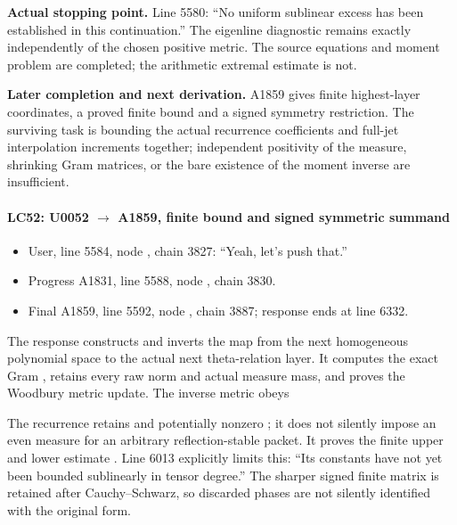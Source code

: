 \textbf{Actual stopping point.} Line 5580: ``No uniform sublinear excess
has been established in this continuation.'' The eigenline diagnostic
remains exactly \protect{} independently of the chosen
positive metric. The source equations and moment problem are completed;
the arithmetic extremal estimate is not.

\textbf{Later completion and next derivation.} A1859 gives finite
highest-layer coordinates, a proved finite bound and a signed symmetry
restriction. The surviving task is bounding the actual recurrence
coefficients and full-jet interpolation increments together; independent
positivity of the measure, shrinking Gram matrices, or the bare
existence of the moment inverse are insufficient.

\paragraph{\texorpdfstring{LC52: U0052
\allowbreak{}\ensuremath{→}\allowbreak{} A1859, finite bound and signed
symmetric
summand}{LC52: U0052  A1859, finite bound and signed symmetric summand}}\label{lc52-u0052-a1859-finite-bound-and-signed-symmetric-summand}

\begin{itemize}
\tightlist
\item
  User, line 5584, node
  \protect{}, chain 3827:
  ``Yeah, let's push that.''
\item
  Progress A1831, line 5588, node
  \protect{}, chain 3830.
\item
  Final A1859, line 5592, node
  \protect{}, chain 3887;
  response ends at line 6332.
\end{itemize}

The response constructs and inverts the map \protect{}
from the next homogeneous polynomial space to the actual next
theta-relation layer. It computes the exact Gram
\protect{}, retains every raw norm and actual measure
mass, and proves the Woodbury metric update. The inverse metric obeys


The recurrence retains \protect{} and potentially nonzero
\protect{}; it does not silently impose an even measure for
an arbitrary reflection-stable packet. It proves the finite upper and
lower estimate
\protect{}. Line
6013 explicitly limits this: ``Its constants have not yet been bounded
sublinearly in tensor degree.'' The sharper signed finite matrix is
retained after Cauchy--Schwarz, so discarded phases are not silently
identified with the original form.

